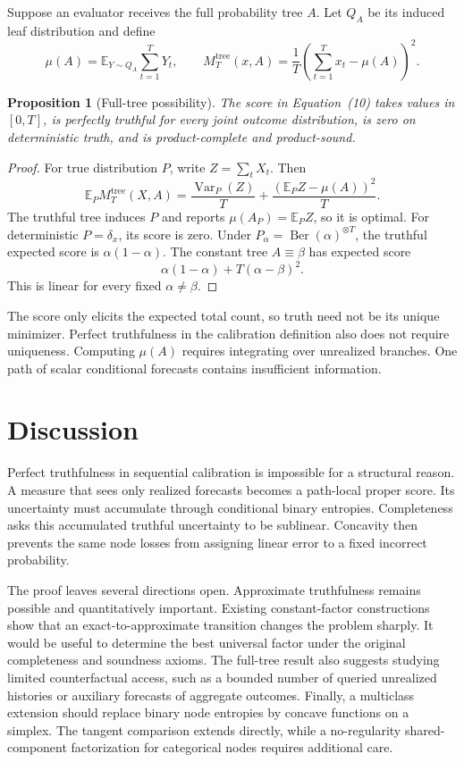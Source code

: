 \documentclass{article}
\newtheorem{proposition}[theorem]{Proposition}
\theoremstyle{definition}
\theoremstyle{remark}
\newcommand{\Ber}{\operatorname{Ber}}
\newcommand{\E}{\mathbb E}
\newcommand{\1}{\mathbf 1}
\begin{document}
Suppose an evaluator receives the full probability tree \(A\). Let \(Q_A\) be its induced leaf distribution and define \[ \mu(A)=\E_{Y\sim Q_A}\sum_{t=1}^T Y_t, \qquad M_T^{\mathrm{tree}}(x,A)=\frac1T\left(\sum_{t=1}^T x_t-\mu(A)\right)^2. \tag{10} \]

\begin{proposition}[Full-tree possibility]\label{prop:fulltree}
The score in Equation~(10) takes values in \([0,T]\), is perfectly truthful for every joint outcome distribution, is zero on deterministic truth, and is product-complete and product-sound.
\end{proposition}

\begin{proof}
For true distribution \(P\), write \(Z=\sum_tX_t\). Then \[ \E_P M_T^{\mathrm{tree}}(X,A) =\frac{\operatorname{Var}_P(Z)}{T} +\frac{(\E_PZ-\mu(A))^2}{T}. \] The truthful tree induces \(P\) and reports \(\mu(A_P)=\E_PZ\), so it is optimal. For deterministic \(P=\delta_x\), its score is zero. Under \(P_\alpha=\Ber(\alpha)^{\otimes T}\), the truthful expected score is \(\alpha(1-\alpha)\). The constant tree \(A\equiv\beta\) has expected score \[ \alpha(1-\alpha)+T(\alpha-\beta)^2. \] This is linear for every fixed \(\alpha\ne\beta\).
\end{proof}

The score only elicits the expected total count, so truth need not be its unique minimizer. Perfect truthfulness in the calibration definition also does not require uniqueness. Computing \(\mu(A)\) requires integrating over unrealized branches. One path of scalar conditional forecasts contains insufficient information.

\section{Discussion}

Perfect truthfulness in sequential calibration is impossible for a structural reason. A measure that sees only realized forecasts becomes a path-local proper score. Its uncertainty must accumulate through conditional binary entropies. Completeness asks this accumulated truthful uncertainty to be sublinear. Concavity then prevents the same node losses from assigning linear error to a fixed incorrect probability.

The proof leaves several directions open. Approximate truthfulness remains possible and quantitatively important. Existing constant-factor constructions show that an exact-to-approximate transition changes the problem sharply. It would be useful to determine the best universal factor under the original completeness and soundness axioms. The full-tree result also suggests studying limited counterfactual access, such as a bounded number of queried unrealized histories or auxiliary forecasts of aggregate outcomes. Finally, a multiclass extension should replace binary node entropies by concave functions on a simplex. The tangent comparison extends directly, while a no-regularity shared-component factorization for categorical nodes requires additional care.
\end{document}
